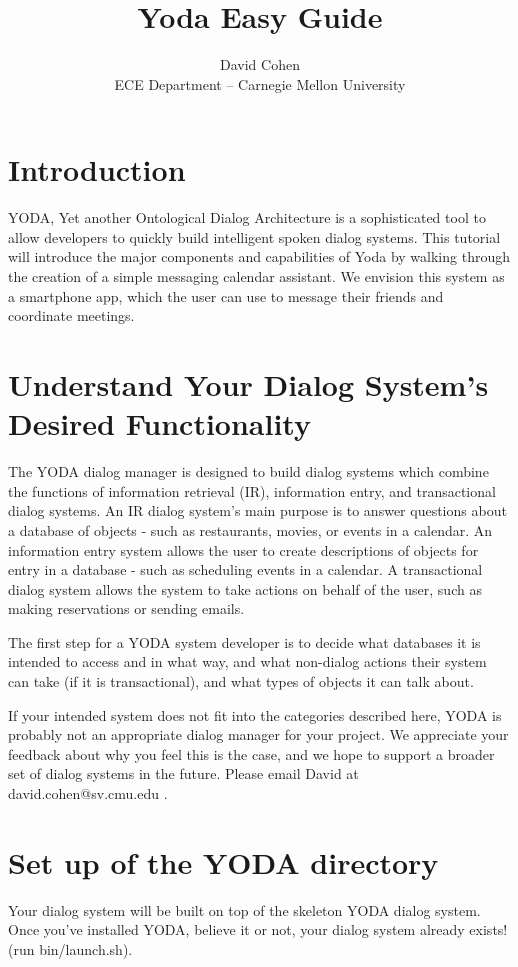 \documentclass[10pt]{article}
\begin{document}
\title{Yoda Easy Guide}
\author{David Cohen\\
ECE Department -- Carnegie Mellon University}
\date{}
\maketitle

\section{Introduction}

\noindent YODA, Yet another Ontological Dialog Architecture is a sophisticated tool to allow developers to quickly build intelligent spoken dialog systems.
This tutorial will introduce the major components and capabilities of Yoda by walking through the creation of a simple messaging calendar assistant.
We envision this system as a smartphone app, which the user can use to message their friends and coordinate meetings.


\section {Understand Your Dialog System's Desired Functionality}
The YODA dialog manager is designed to build dialog systems which combine the functions of information retrieval (IR), information entry, and transactional dialog systems.
An IR dialog system's main purpose is to answer questions about a database of objects - such as restaurants, movies, or events in a calendar.
An information entry system allows the user to create descriptions of objects for entry in a database - such as scheduling events in a calendar.
A transactional dialog system allows the system to take actions on behalf of the user, such as making reservations or sending emails.

The first step for a YODA system developer is to decide what databases it is intended to access and in what way, and what non-dialog actions their system can take (if it is transactional), and what types of objects it can talk about.

If your intended system does not fit into the categories described here, YODA is probably not an appropriate dialog manager for your project.
We appreciate your feedback about why you feel this is the case, and we hope to support a broader set of dialog systems in the future.
Please email David at david.cohen@sv.cmu.edu .

\section {Set up of the YODA directory}
Your dialog system will be built on top of the skeleton YODA dialog system.
Once you've installed YODA, believe it or not, your dialog system already exists! (run bin/launch.sh).
\end{document}
